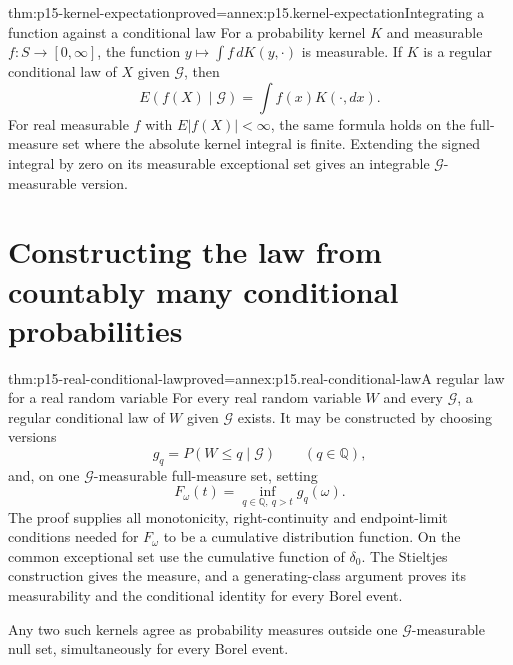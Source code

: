\begin{hbtheorem}{thm:p15-kernel-expectation}{proved=annex:p15.kernel-expectation}{Integrating a function against a conditional law}
For a probability kernel \(K\) and measurable \(f:S\to[0,\infty]\),
the function \(y\mapsto\int f\,dK(y,\cdot)\) is measurable.
If \(K\) is a regular conditional law of \(X\) given \(\mathcal G\), then
\[
                         E(f(X)\mid\mathcal G)
                              =\int f(x)K(\cdot,dx).
\]
For real measurable \(f\) with \(E|f(X)|<\infty\), the same formula
holds on the full-measure set where the absolute kernel integral is
finite. Extending the signed integral by zero on its measurable
exceptional set gives an integrable \(\mathcal G\)-measurable version.
\end{hbtheorem}

\section{Constructing the law from countably many conditional probabilities}
\label{sec:p15-conditional-cdf-construction}

\begin{hbtheorem}{thm:p15-real-conditional-law}{proved=annex:p15.real-conditional-law}{A regular law for a real random variable}
For every real random variable \(W\) and every \(\mathcal G\),
a regular conditional law of \(W\) given \(\mathcal G\) exists.
It may be constructed by choosing versions
\[
                          g_q=P(W\leq q\mid\mathcal G)
                                     \qquad(q\in\mathbb Q),
\]
and, on one \(\mathcal G\)-measurable full-measure set, setting
\[
                          F_\omega(t)=\inf_{q\in\mathbb Q,\ q>t}g_q(\omega).
\]
The proof supplies all monotonicity, right-continuity and endpoint-limit
conditions needed for \(F_\omega\) to be a cumulative distribution function.
On the common exceptional set use the cumulative function of \(\delta_0\).
The Stieltjes construction gives the measure, and a generating-class
argument proves its measurability and the conditional identity for every
Borel event.

Any two such kernels agree as probability measures outside one
\(\mathcal G\)-measurable null set, simultaneously for every Borel event.
\end{hbtheorem}

